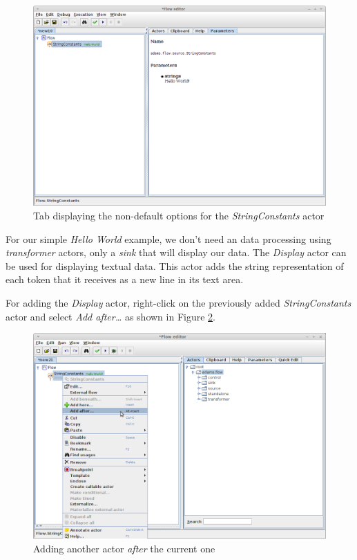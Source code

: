 \begin{figure}[htb]
  \centering
  \includegraphics[width=12.0cm]{images/floweditor-helloworld-actoroptions.png}
  \caption{Tab displaying the non-default options for the
  \textit{StringConstants} actor}
  \label{floweditor-helloworld-actoroptions}
\end{figure}

For our simple \textit{Hello World} example, we don't need an data processing
using \textit{transformer} actors, only a \textit{sink} that will display our
data. The \textit{Display} actor can be used for displaying textual data. This
actor adds the string representation of each token that it receives as a new
line in its text area.

For adding the \textit{Display} actor, right-click on the previously added
\textit{StringConstants} actor and select \textit{Add after\ldots} as shown in
Figure \ref{floweditor-helloworld-addactor6}.

\begin{figure}[htb]
  \centering
  \includegraphics[width=12.0cm]{images/floweditor-helloworld-addactor6.png}
  \caption{Adding another actor \textit{after} the current one}
  \label{floweditor-helloworld-addactor6}
\end{figure}

